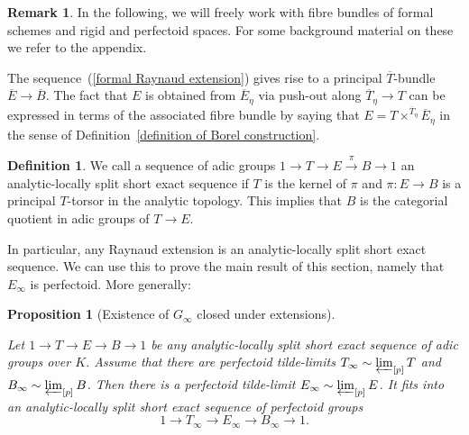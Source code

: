 \documentclass[10pt,oneside]{amsart}
\newtheorem{proposition}[theorem]{Proposition}
\theoremstyle{definition}
\newtheorem{definition}[theorem]{Definition}
\newtheorem{remark}[theorem]{Remark}
\begin{document}
	
	\begin{remark}
	In the following, we will freely work with fibre bundles of formal schemes and rigid and perfectoid spaces. For some background material on these we refer to the appendix.
	\end{remark}
	
	The sequence~(\ref{formal Raynaud extension}) gives rise to a principal $\overline{T}$-bundle
	$\overline{E}\rightarrow \overline{B}$. The fact that $E$ is obtained from $\overline{E}_\eta$ via push-out along $\overline{T}_\eta\rightarrow T$ can be expressed in terms of the associated fibre bundle by saying that $E = T\times^{\overline{T}_\eta}\overline{E}_\eta$ in the sense of Definition~\ref{definition of Borel construction}.
	\begin{definition}
		We call a sequence of adic groups $1\to T\to E\xrightarrow{\pi} B\to 1$ an analytic-locally split short exact sequence if $T$ is the kernel of $\pi$ and $\pi:E\to B$ is a principal $T$-torsor in the analytic topology. This implies that $B$ is the categorial quotient in adic groups of $T\to E$.
	\end{definition}
	In particular, any Raynaud extension is an analytic-locally split short exact sequence. We can use this to prove the main result of this section, namely that $E_\infty$ is perfectoid. More generally:
	\begin{proposition}[Existence of $G_\infty$ closed under extensions]\label{p-F-formal tower exists for E}
		
		Let $1\to T\to E\to B\to 1$ be any analytic-locally split short exact sequence of adic groups over $K$. Assume that there are perfectoid tilde-limits $T_\infty \sim \varprojlim_{[p]} T$ and $B_\infty\sim \varprojlim_{[p]}B$. Then
		there is a perfectoid tilde-limit $E_\infty\sim \varprojlim_{[p]}E$. It fits into an analytic-locally split short exact sequence of perfectoid groups 
		\[1\to T_\infty\to E_\infty\to B_\infty\to 1.\]
	\end{proposition}
\end{document}
